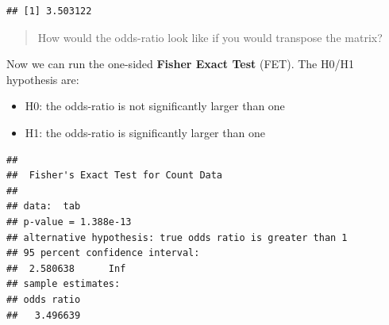 \documentclass[
]{book}
\newenvironment{Shaded}{\begin{snugshade}}{\end{snugshade}}
\newcommand{\AttributeTok}[1]{\textcolor[rgb]{0.13,0.29,0.53}{#1}}
\newcommand{\CommentTok}[1]{\textcolor[rgb]{0.56,0.35,0.01}{\textit{#1}}}
\newcommand{\DecValTok}[1]{\textcolor[rgb]{0.00,0.00,0.81}{#1}}
\newcommand{\DocumentationTok}[1]{\textcolor[rgb]{0.56,0.35,0.01}{\textbf{\textit{#1}}}}
\newcommand{\FunctionTok}[1]{\textcolor[rgb]{0.13,0.29,0.53}{\textbf{#1}}}
\newcommand{\NormalTok}[1]{#1}
\newcommand{\OtherTok}[1]{\textcolor[rgb]{0.56,0.35,0.01}{#1}}
\newcommand{\SpecialCharTok}[1]{\textcolor[rgb]{0.81,0.36,0.00}{\textbf{#1}}}
\newcommand{\StringTok}[1]{\textcolor[rgb]{0.31,0.60,0.02}{#1}}
\providecommand{\tightlist}{%
  \setlength{\itemsep}{0pt}\setlength{\parskip}{0pt}}
\begin{document}
\begin{Shaded}
\end{Shaded}

\begin{verbatim}
## [1] 3.503122
\end{verbatim}

\begin{quote}
How would the odds-ratio look like if you would transpose the matrix?
\end{quote}

Now we can run the one-sided \textbf{Fisher Exact Test} (FET).
The H0/H1 hypothesis are:

\begin{itemize}
\tightlist
\item
  H0: the odds-ratio is not significantly larger than one
\item
  H1: the odds-ratio is significantly larger than one
\end{itemize}

\begin{Shaded}
\end{Shaded}

\begin{verbatim}
## 
##  Fisher's Exact Test for Count Data
## 
## data:  tab
## p-value = 1.388e-13
## alternative hypothesis: true odds ratio is greater than 1
## 95 percent confidence interval:
##  2.580638      Inf
## sample estimates:
## odds ratio 
##   3.496639
\end{verbatim}
\end{document}
